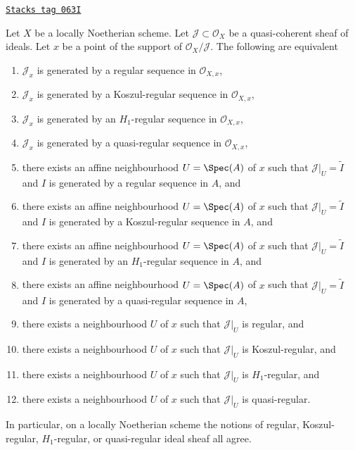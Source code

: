 \begin{lemma}
\label{divisors-lemma-Noetherian-scheme-regular-ideal}
\href{https://stacks.math.columbia.edu/tag/063I}{\texttt{Stacks tag 063I}}

Let $X$ be a locally Noetherian scheme. Let $\mathcal{J} \subset \mathcal{O}_X$
be a quasi-coherent sheaf of ideals. Let $x$ be a point of the support of
$\mathcal{O}_X/\mathcal{J}$. The following are equivalent
\begin{enumerate}
\item $\mathcal{J}_x$ is generated by a regular sequence in
$\mathcal{O}_{X, x}$,
\item $\mathcal{J}_x$ is generated by a Koszul-regular sequence in
$\mathcal{O}_{X, x}$,
\item $\mathcal{J}_x$ is generated by an $H_1$-regular sequence in
$\mathcal{O}_{X, x}$,
\item $\mathcal{J}_x$ is generated by a quasi-regular sequence in
$\mathcal{O}_{X, x}$,
\item there exists an affine neighbourhood $U = \Spec(A)$ of $x$ such
that $\mathcal{J}|_U = \widetilde{I}$ and $I$ is generated by a
regular sequence in $A$, and
\item there exists an affine neighbourhood $U = \Spec(A)$ of $x$ such
that $\mathcal{J}|_U = \widetilde{I}$ and $I$ is generated by a
Koszul-regular sequence in $A$, and
\item there exists an affine neighbourhood $U = \Spec(A)$ of $x$ such
that $\mathcal{J}|_U = \widetilde{I}$ and $I$ is generated by an
$H_1$-regular sequence in $A$, and
\item there exists an affine neighbourhood $U = \Spec(A)$ of $x$ such
that $\mathcal{J}|_U = \widetilde{I}$ and $I$ is generated by a
quasi-regular sequence in $A$,
\item there exists a neighbourhood $U$ of $x$ such that $\mathcal{J}|_U$
is regular, and
\item there exists a neighbourhood $U$ of $x$ such that $\mathcal{J}|_U$
is Koszul-regular, and
\item there exists a neighbourhood $U$ of $x$ such that $\mathcal{J}|_U$
is $H_1$-regular, and
\item there exists a neighbourhood $U$ of $x$ such that $\mathcal{J}|_U$
is quasi-regular.
\end{enumerate}
In particular, on a locally Noetherian scheme the notions of
regular, Koszul-regular, $H_1$-regular, or quasi-regular ideal sheaf all agree.
\end{lemma}


